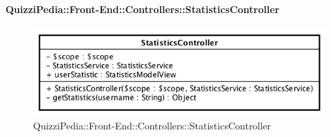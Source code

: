 \paragraph{QuizziPedia::Front-End::Controllers::StatisticsController}
\begin{figure} [ht]
	\centering
	\includegraphics[scale=0.8]{UML/Classi/Front-End/QuizziPedia_Front-end_Controller_StatisticsController.png}
	\caption{QuizziPedia::Front-End::Controllers::StatisticsController}
\end{figure} \FloatBarrier
